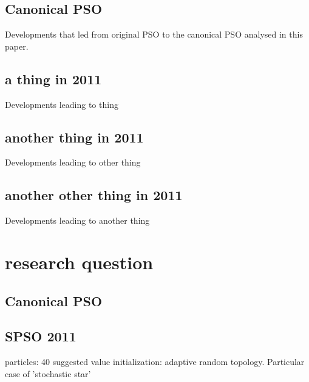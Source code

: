\documentclass{csfourzero}
\begin{document}
\subsection{Canonical PSO}

Developments that led from original PSO to the canonical PSO analysed in this
paper.

\subsection{a thing in 2011}
Developments leading to thing

\subsection{another thing in 2011}
Developments leading to other thing

\subsection{another other thing in 2011}
Developments leading to another thing

\section{research question}

\subsection{Canonical PSO}

\subsection{SPSO 2011}

particles: 40 suggested value
initialization: adaptive random topology. Particular case of 'stochastic star'
\end{document}
